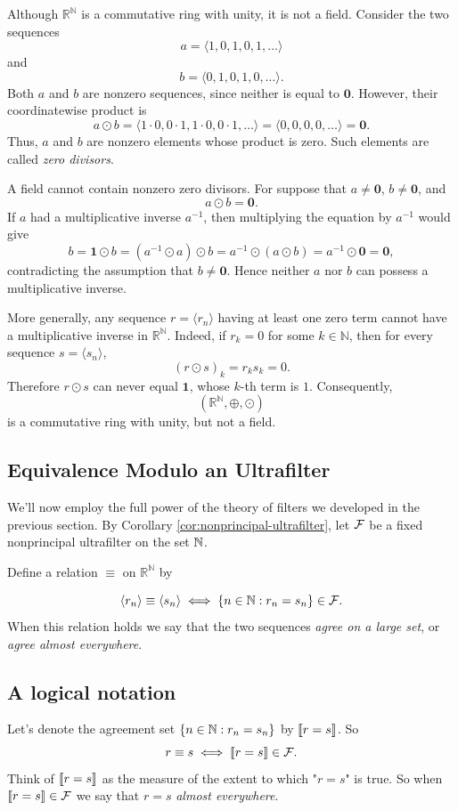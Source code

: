 Although \(\mathbb{R}^{\mathbb{N}}\) is a commutative ring with unity, it is
not a field. Consider the two sequences
\[
a=\langle 1,0,1,0,1,\ldots\rangle
\]
and
\[
b=\langle 0,1,0,1,0,\ldots\rangle.
\]
Both \(a\) and \(b\) are nonzero sequences, since neither is equal to
\(\mathbf{0}\). However, their coordinatewise product is
\[
a\odot b
=
\langle 1\cdot 0,0\cdot 1,1\cdot 0,0\cdot 1,\ldots\rangle
=
\langle 0,0,0,0,\ldots\rangle
=
\mathbf{0}.
\]
Thus, \(a\) and \(b\) are nonzero elements whose product is zero. Such
elements are called \emph{zero divisors}.

A field cannot contain nonzero zero divisors. For suppose that \(a\neq
\mathbf{0}\), \(b\neq\mathbf{0}\), and
\[
a\odot b=\mathbf{0}.
\]
If \(a\) had a multiplicative inverse \(a^{-1}\), then multiplying the
equation by \(a^{-1}\) would give
\[
b
=
\mathbf{1}\odot b
=
(a^{-1}\odot a)\odot b
=
a^{-1}\odot(a\odot b)
=
a^{-1}\odot\mathbf{0}
=
\mathbf{0},
\]
contradicting the assumption that \(b\neq\mathbf{0}\). Hence neither \(a\)
nor \(b\) can possess a multiplicative inverse.

More generally, any sequence \(r=\langle r_n\rangle\) having at least one
zero term cannot have a multiplicative inverse in
\(\mathbb{R}^{\mathbb{N}}\). Indeed, if \(r_k=0\) for some
\(k\in\mathbb{N}\), then for every sequence \(s=\langle s_n\rangle\),
\[
(r\odot s)_k=r_ks_k=0.
\]
Therefore \(r\odot s\) can never equal \(\mathbf{1}\), whose \(k\)-th term
is \(1\). Consequently,
\[
(\mathbb{R}^{\mathbb{N}},\oplus,\odot)
\]
is a commutative ring with unity, but not a field.

\subsection{Equivalence Modulo an Ultrafilter}
We'll now employ the full power of the theory of filters we developed in the previous section. By Corollary \ref{cor:nonprincipal-ultrafilter}, let $\mathcal{F}$ be a fixed nonprincipal ultrafilter on the set $\mathbb{N}$.

Define a relation $\equiv$ on $\mathbb{R}^\mathbb{N}$ by

$$
\langle r_n \rangle \equiv \langle s_n \rangle \iff \{ n \in \mathbb{N} : r_n = s_n \} \in \mathcal{F}.
$$
When this relation holds we say that the two sequences \textit{agree on a large set}, or \textit{agree almost everywhere}.

\subsection{A logical notation}
Let's denote the agreement set $\{ n \in \mathbb{N} : r_n = s_n \}$ by $\llbracket r = s \rrbracket$. So
$$
r \equiv s \iff \llbracket r=s \rrbracket \in \mathcal{F}.
$$
Think of $\llbracket r=s \rrbracket$ as the measure of the extent to which "$r=s$" is true. So when $\llbracket r=s \rrbracket \in \mathcal{F}$ we say that $r=s$ \textit{almost everywhere}. 

